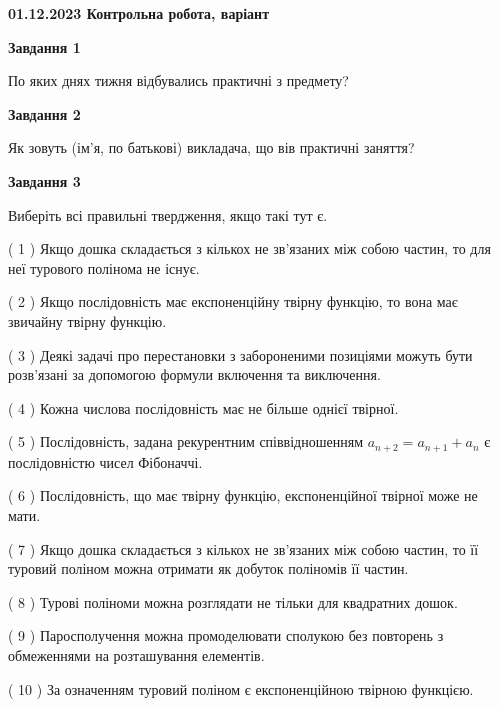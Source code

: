 \documentclass[12pt, ukrainian]{article}
\begin{document}
\begin {large}

\textbf{01.12.2023 Контрольна робота, варіант  }\par


{
{\begin {center}\textbf{Завдання 1}\end {center}}\par
По яких днях тижня відбувались практичні з предмету?\par
{\begin {center}\textbf{Завдання 2}\end {center}}\par
Як зовуть (ім'я, по батькові) викладача, що вів практичні заняття?\par
{\begin {center}\textbf{Завдання 3}\end {center}}\par
Виберіть всі правильні твердження, якщо такі тут є.\par
\vspace{2mm}
( 1 ) Якщо дошка складається з кількох не зв’язаних між собою частин, то для неї турового полінома не існує.%

( 2 ) Якщо послідовність має експоненційну твірну функцію, то вона має звичайну твірну функцію.%

( 3 ) Деякі задачі про перестановки з забороненими позиціями можуть бути розв’я\-за\-ні за допомогою формули включення та виключення.%

( 4 ) Кожна числова послідовність має не більше однієї твірної.%

( 5 ) Послідовність, задана рекурентним співвідношенням $a_{n+2}=a_{n+1}+a_{n}$ є послідовністю чисел Фібоначчі.%

( 6 ) Послідовність, що має твірну функцію, експоненційної твірної може не мати.%

( 7 ) Якщо дошка складається з кількох не зв’язаних між собою частин, то її туровий поліном можна отримати як добуток поліномів її частин.%

( 8 ) Турові поліноми можна розглядати не тільки для квадратних дошок.%

( 9 ) Паросполучення можна промоделювати сполукою без повторень з обмеженнями на розташування елементів.%

( 10 ) За означенням туровий поліном є експоненційною твірною функцією.%
}
\end {large}

\vspace{4mm}
\newpage
\end{document}
